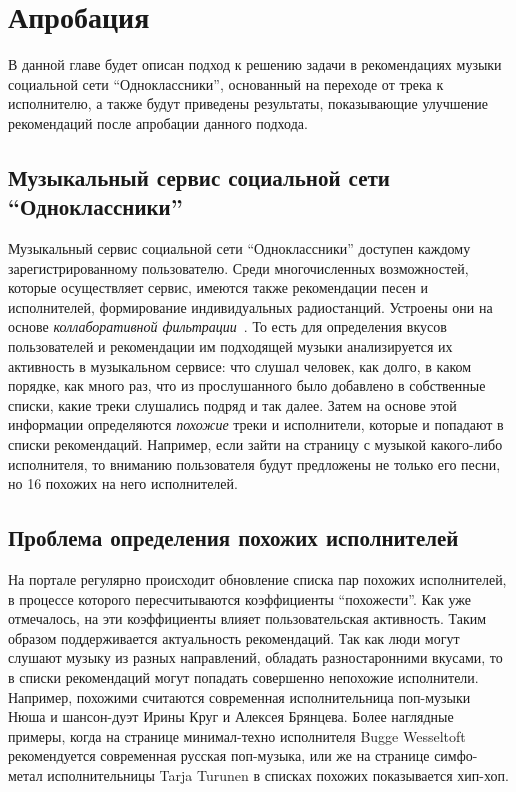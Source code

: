\chapter{Апробация} 
\label{approbation}

В данной главе будет описан подход к решению задачи в рекомендациях музыки социальной сети ``Одноклассники'', основанный на переходе
от трека к исполнителю, а также будут приведены результаты, показывающие улучшение рекомендаций после апробации данного подхода.

\section{Музыкальный сервис социальной сети “Одноклассники”}

Музыкальный сервис социальной сети ``Одноклассники'' доступен каждому зарегистрированному пользователю. Среди многочисленных возможностей, 
которые осуществляет сервис, имеются также рекомендации песен и исполнителей, формирование индивидуальных радиостанций. Устроены они на 
основе \emph{коллаборативной фильтрации}~\cite{bugaychenko}. То есть для определения вкусов пользователей и рекомендации им подходящей музыки анализируется 
их активность в музыкальном сервисе: что слушал человек, как долго, в каком порядке, как много раз, что из прослушанного было добавлено 
в собственные списки, какие треки слушались подряд и так далее. Затем на основе этой информации определяются \emph{похожие} треки и исполнители,
которые и попадают в списки рекомендаций. Например, если зайти на страницу с музыкой какого-либо исполнителя, то вниманию пользователя будут 
предложены не только его песни, но 16 похожих на него исполнителей.

\section{Проблема определения похожих исполнителей}

На портале регулярно происходит обновление списка пар похожих исполнителей, в процессе которого пересчитываются коэффициенты ``похожести''.
Как уже отмечалось, на эти коэффициенты влияет пользовательская активность. Таким образом поддерживается актуальность рекомендаций.
Так как люди могут слушают музыку из разных направлений, обладать разностаронними вкусами, то в списки рекомендаций могут попадать совершенно
непохожие исполнители. Например, похожими считаются современная исполнительница поп-музыки Нюша и шансон-дуэт Ирины Круг и Алексея Брянцева.
Более наглядные примеры, когда на странице минимал-техно исполнителя Bugge Wesseltoft рекомендуется современная русская поп-музыка, или же 
на странице симфо-метал исполнительницы Tarja Turunen в списках похожих показывается хип-хоп.

